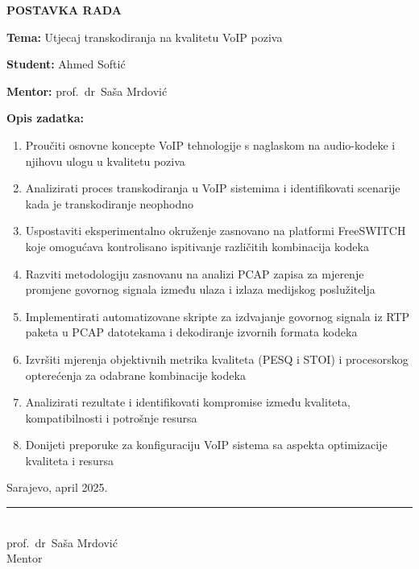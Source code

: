 \thispagestyle{empty} %
\begin{center}
\textbf{\LARGE POSTAVKA RADA}
\end{center}

\vspace{1cm}

\textbf{Tema:} Utjecaj transkodiranja na kvalitetu VoIP poziva

\vspace{0.5cm}

\textbf{Student:} Ahmed Softić

\vspace{0.5cm}

\textbf{Mentor:} prof.\ dr\ Saša Mrdović

\vspace{1cm}

\textbf{Opis zadatka:}

\begin{enumerate}
\item Proučiti osnovne koncepte VoIP tehnologije s naglaskom na audio-kodeke i njihovu ulogu u kvalitetu poziva
\item Analizirati proces transkodiranja u VoIP sistemima i identifikovati scenarije kada je transkodiranje neophodno
\item Uspostaviti eksperimentalno okruženje zasnovano na platformi FreeSWITCH koje omogućava kontrolisano ispitivanje različitih kombinacija kodeka
\item Razviti metodologiju zasnovanu na analizi PCAP zapisa za mjerenje promjene govornog signala između ulaza i izlaza medijskog poslužitelja
\item Implementirati automatizovane skripte za izdvajanje govornog signala iz RTP paketa u PCAP datotekama i dekodiranje izvornih formata kodeka
\item Izvršiti mjerenja objektivnih metrika kvaliteta (PESQ i STOI) i procesorskog opterećenja za odabrane kombinacije kodeka
\item Analizirati rezultate i identifikovati kompromise između kvaliteta, kompatibilnosti i potrošnje resursa
\item Donijeti preporuke za konfiguraciju VoIP sistema sa aspekta optimizacije kvaliteta i resursa
\end{enumerate}

\vspace{1cm}

\noindent Sarajevo, april 2025.

\vspace{2cm}

\hfill\begin{minipage}{6cm}
\centering
\rule{6cm}{0.4pt}\\
prof.\ dr\ Saša Mrdović\\
Mentor
\end{minipage}
